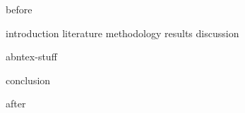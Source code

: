 \documentclass[
    12pt,
openright,             %
    twoside,               %
    a4paper,
french,            %
ngerman,           %
spanish,           %
brazil,            %
british,           %
    ]{abntex2}
\begin{document}
{before}

\textual{}  %

{introduction}
{literature}
{methodology}
{results}
{discussion}

{abntex-stuff}


{conclusion}

\postextual{}  %


{after}
\end{document}
